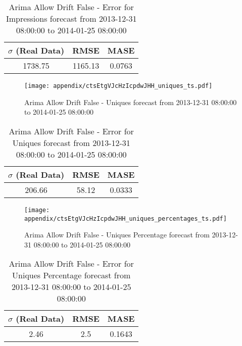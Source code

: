 \begin{table}[H]
\centering
\footnotesize
\begin{tabular}{ccc}
$\sigma$ (Real Data) & RMSE & MASE   \\ \hline
1738.75 & 1165.13 & 0.0763 \\
\end{tabular}

\vspace{0.5cm}

\caption[]{
Arima Allow Drift False - Error for Impressions forecast from 2013-12-31 08:00:00 to 2014-01-25 08:00:00}
\end{table}

\begin{figure}[H] \begin{center} \leavevmode
\texttt{[image: appendix/ctsEtgVJcHzIcpdwJHH\_uniques\_ts.pdf]} \caption[]{
Arima Allow Drift False - Uniques forecast from 2013-12-31 08:00:00 to 2014-01-25 08:00:00} \label{fig:appendix/ctsEtgVJcHzIcpdwJHH_uniques_ts.pdf} \end{center}
\end{figure}

\begin{table}[H]
\centering
\footnotesize
\begin{tabular}{ccc}
$\sigma$ (Real Data) & RMSE & MASE   \\ \hline
206.66 & 58.12 & 0.0333 \\
\end{tabular}

\vspace{0.5cm}

\caption[]{
Arima Allow Drift False - Error for Uniques forecast from 2013-12-31 08:00:00 to 2014-01-25 08:00:00}
\end{table}

\begin{figure}[H] \begin{center} \leavevmode
\texttt{[image: appendix/ctsEtgVJcHzIcpdwJHH\_uniques\_percentages\_ts.pdf]} \caption[]{
Arima Allow Drift False - Uniques Percentage forecast from 2013-12-31 08:00:00 to 2014-01-25 08:00:00} \label{fig:appendix/ctsEtgVJcHzIcpdwJHH_uniques_percentages_ts.pdf} \end{center}
\end{figure}

\begin{table}[H]
\centering
\footnotesize
\begin{tabular}{ccc}
$\sigma$ (Real Data) & RMSE & MASE   \\ \hline
2.46 & 2.5 & 0.1643 \\
\end{tabular}

\vspace{0.5cm}

\caption[]{
Arima Allow Drift False - Error for Uniques Percentage forecast from 2013-12-31 08:00:00 to 2014-01-25 08:00:00}
\end{table}

